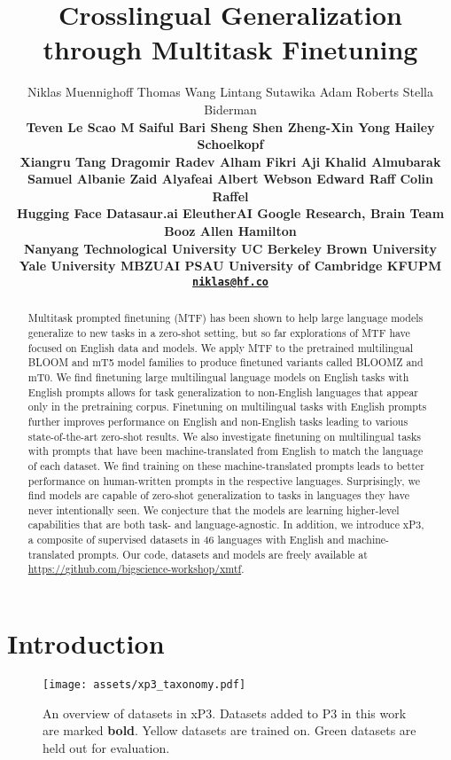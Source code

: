 \documentclass[11pt]{article}
\title{Crosslingual Generalization through Multitask Finetuning}
\author{
Niklas Muennighoff
\quad Thomas Wang 
\quad Lintang Sutawika 
\quad Adam Roberts
\quad Stella Biderman\\
\bf \quad Teven Le Scao
\bf \quad M Saiful Bari 
\bf \quad Sheng Shen 
\bf \quad Zheng-Xin Yong
\bf \quad Hailey Schoelkopf \\
\bf \quad Xiangru Tang  
\bf \quad Dragomir Radev 
\bf \quad Alham Fikri Aji
\bf \quad Khalid Almubarak\\
\bf \quad Samuel Albanie
\bf \quad Zaid Alyafeai
\bf \quad Albert Webson
\bf \quad Edward Raff
\bf \quad Colin Raffel \\
  Hugging Face \quad
  Datasaur.ai \quad
  EleutherAI \quad
  Google Research, Brain Team \quad
  Booz Allen Hamilton \quad\\
  Nanyang Technological University \quad
   UC Berkeley \quad
   Brown University \quad \\
   Yale University \quad
   MBZUAI \quad  
   PSAU \quad
   University of Cambridge 
   KFUPM\\
  {\tt \href{mailto:niklas@hf.co}{niklas@hf.co}}
}
\begin{document}
\maketitle
\begin{abstract}

Multitask prompted finetuning (MTF) has been shown to help large language models generalize to new tasks in a zero-shot setting, but so far explorations of MTF have focused on English data and models. We apply MTF to the pretrained multilingual BLOOM and mT5 model families to produce finetuned variants called BLOOMZ and mT0. We find finetuning large multilingual language models on English tasks with English prompts allows for task generalization to non-English languages that appear only in the pretraining corpus. Finetuning on multilingual tasks with English prompts further improves performance on English and non-English tasks leading to various state-of-the-art zero-shot results. We also investigate finetuning on multilingual tasks with prompts that have been machine-translated from English to match the language of each dataset. We find training on these machine-translated prompts leads to better performance on human-written prompts in the respective languages. Surprisingly, we find models are capable of zero-shot generalization to tasks in languages they have never intentionally seen. We conjecture that the models are learning higher-level capabilities that are both task- and language-agnostic. In addition, we introduce xP3, a composite of supervised datasets in 46 languages with English and machine-translated prompts. Our code, datasets and models are freely available at \url{https://github.com/bigscience-workshop/xmtf}.

\end{abstract}

\section{Introduction}

\begin{figure*}[ht]
    \centering
    \begin{center}
        \texttt{[image: assets/xp3\_taxonomy.pdf]}
        \caption{An overview of datasets in xP3. Datasets added to P3 in this work are marked \textbf{bold}. Yellow datasets are trained on. Green datasets are held out for evaluation.}
        \label{fig:xp3tasks}
    \end{center}
\end{figure*}
\end{document}
